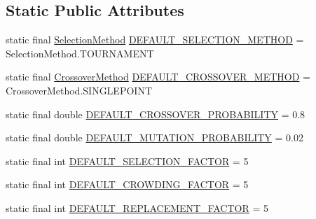 \subsection*{Static Public Attributes}
\begin{CompactItemize}
\item 
static final \hyperlink{classjenes_1_1stage_1_1operator_1_1common_1_1_multi_niche_crowder_3_01_t_01extends_01_chromosome_01_4_1190dbbe875b99f6679f7b5deb68483b}{SelectionMethod} \hyperlink{classjenes_1_1stage_1_1operator_1_1common_1_1_multi_niche_crowder_3_01_t_01extends_01_chromosome_01_4_ddd3f5fe352248ed9d5639e0d138f59d}{DEFAULT\_\-SELECTION\_\-METHOD} = SelectionMethod.TOURNAMENT
\item 
static final \hyperlink{classjenes_1_1stage_1_1operator_1_1common_1_1_multi_niche_crowder_3_01_t_01extends_01_chromosome_01_4_273881bd444aeae8ef77816000eac94c}{CrossoverMethod} \hyperlink{classjenes_1_1stage_1_1operator_1_1common_1_1_multi_niche_crowder_3_01_t_01extends_01_chromosome_01_4_ed986ca7d89144f78e73a11a5fb2f032}{DEFAULT\_\-CROSSOVER\_\-METHOD} = CrossoverMethod.SINGLEPOINT
\item 
static final double \hyperlink{classjenes_1_1stage_1_1operator_1_1common_1_1_multi_niche_crowder_3_01_t_01extends_01_chromosome_01_4_6e6d3f4e8201a341f77ac92954dbdad4}{DEFAULT\_\-CROSSOVER\_\-PROBABILITY} = 0.8
\item 
static final double \hyperlink{classjenes_1_1stage_1_1operator_1_1common_1_1_multi_niche_crowder_3_01_t_01extends_01_chromosome_01_4_a3cfe11747630124e10809b0027d6f3a}{DEFAULT\_\-MUTATION\_\-PROBABILITY} = 0.02
\item 
static final int \hyperlink{classjenes_1_1stage_1_1operator_1_1common_1_1_multi_niche_crowder_3_01_t_01extends_01_chromosome_01_4_937e501fc953576f30be99a0eec9ccf4}{DEFAULT\_\-SELECTION\_\-FACTOR} = 5
\item 
static final int \hyperlink{classjenes_1_1stage_1_1operator_1_1common_1_1_multi_niche_crowder_3_01_t_01extends_01_chromosome_01_4_e7c682fcbb8e1de5270d79ca482bd93d}{DEFAULT\_\-CROWDING\_\-FACTOR} = 5
\item 
static final int \hyperlink{classjenes_1_1stage_1_1operator_1_1common_1_1_multi_niche_crowder_3_01_t_01extends_01_chromosome_01_4_c38d4afc42b5f54473834e76815c7510}{DEFAULT\_\-REPLACEMENT\_\-FACTOR} = 5
\end{CompactItemize}
